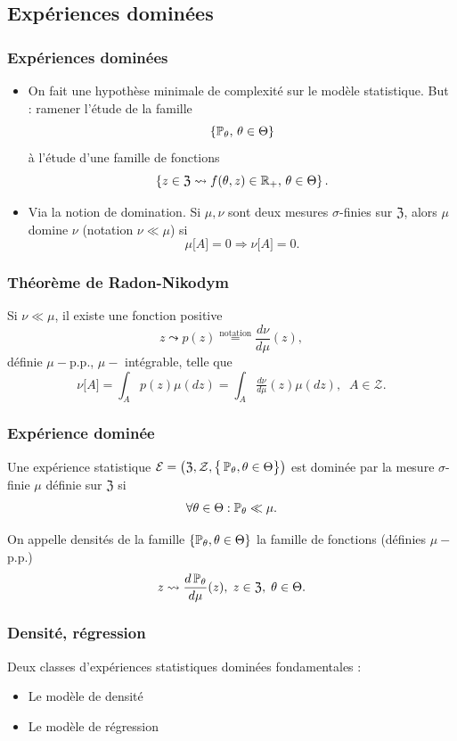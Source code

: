 \subsection{Expériences dominées}
\begin{frame}
\frametitle{Expériences dominées}
\begin{itemize}
\item On fait une hypothèse minimale de  complexité  sur le modèle statistique. \alert{ But} : ramener l'étude de la famille
$$\{\operatorname{{\mathbb P}}_\theta,\,\theta \in \Theta\}$$
à l'étude d'une famille de fonctions
$$\left\{z \in \mathfrak{Z} \leadsto f(\theta,z) \in \operatorname{{\mathbb R}}_+,\,\theta \in \Theta\right\}.$$
\item Via la notion de \alert{ domination}. Si $\mu,\nu$ sont deux mesures $\sigma$-finies sur $\mathfrak{Z}$, alors $\mu$ \alert{ domine} $\nu$ (notation $\nu \ll \mu$) si
$$\mu\big[A\big]=0 \Rightarrow \nu\big[A\big]=0.$$
\end{itemize}
\end{frame}
\begin{frame}
\frametitle{Théorème de Radon-Nikodym}
\begin{theo}
Si $\nu \ll \mu$, il existe une fonction positive
$$z \leadsto  p(z) \stackrel{\text{notation}}{=} \frac{d\nu}{d\mu}(z),$$ définie $\mu-$p.p., $\mu-$ intégrable, telle que
$$\nu\big[A\big] = \int_{A}p(z) \mu(dz) = \int_{A}\tfrac{d\nu}{d\mu}(z)\mu(dz),\;\;A \in {\mathcal Z}.$$
\end{theo}
\end{frame}
\begin{frame}
\frametitle{Expérience dominée}
\begin{df}
Une expérience statistique ${\mathcal E} = \big(\mathfrak{Z}, {\mathcal Z}, \big\{\operatorname{{\mathbb P}}_\theta, \theta \in \Theta\big\}\big)$ est \alert{dominée} par la mesure $\sigma$-finie $\mu$ définie sur $\mathfrak{Z}$ si
$$\forall \theta \in \Theta : \operatorname{{\mathbb P}}_\theta \ll \mu.$$
\end{df}
On appelle \alert{ densités} de la famille $\{\operatorname{{\mathbb P}}_\theta,\theta \in \Theta\}$ la famille de fonctions (définies $\mu-$ p.p.)
$$z\leadsto \frac{d\operatorname{{\mathbb P}}_\theta}{d\mu}(z),\;z\in \mathfrak{Z},\;\theta \in \Theta.$$
\end{frame}

\begin{frame}
\frametitle{Densité, régression}
Deux classes d'expériences statistiques \alert{dominées} fondamentales :
\begin{itemize}
\item Le modèle de \alert{ densité}
\item Le modèle de \alert{régression }
\end{itemize}
\end{frame}


